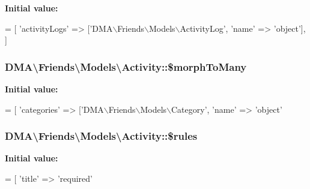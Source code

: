 {\bfseries Initial value\-:}
\begin{DoxyCode}
= [ 
        \textcolor{stringliteral}{'activityLogs'}  => [\textcolor{stringliteral}{'DMA\(\backslash\)Friends\(\backslash\)Models\(\backslash\)ActivityLog'}, \textcolor{stringliteral}{'name'} => \textcolor{stringliteral}{'object'}],
    ]
\end{DoxyCode}
\hypertarget{classDMA_1_1Friends_1_1Models_1_1Activity_a5cfb1d646716be755dcdb6ddb3ab16b1}{
\subsubsection[{\$morph\-To\-Many}]{\setlength{\rightskip}{0pt plus 5cm}D\-M\-A\textbackslash{}\-Friends\textbackslash{}\-Models\textbackslash{}\-Activity\-::\$morph\-To\-Many}}\label{classDMA_1_1Friends_1_1Models_1_1Activity_a5cfb1d646716be755dcdb6ddb3ab16b1}
{\bfseries Initial value\-:}
\begin{DoxyCode}
= [
        \textcolor{stringliteral}{'categories'}    => [\textcolor{stringliteral}{'DMA\(\backslash\)Friends\(\backslash\)Models\(\backslash\)Category'}, \textcolor{stringliteral}{'name'} => \textcolor{stringliteral}{'object'}
\end{DoxyCode}
\hypertarget{classDMA_1_1Friends_1_1Models_1_1Activity_a0b92e75aa8d92e2d3c9b24f54cd813bc}{
\subsubsection[{\$rules}]{\setlength{\rightskip}{0pt plus 5cm}D\-M\-A\textbackslash{}\-Friends\textbackslash{}\-Models\textbackslash{}\-Activity\-::\$rules}}\label{classDMA_1_1Friends_1_1Models_1_1Activity_a0b92e75aa8d92e2d3c9b24f54cd813bc}
{\bfseries Initial value\-:}
\begin{DoxyCode}
= [ 
        \textcolor{stringliteral}{'title'} => \textcolor{stringliteral}{'required'}
\end{DoxyCode}
